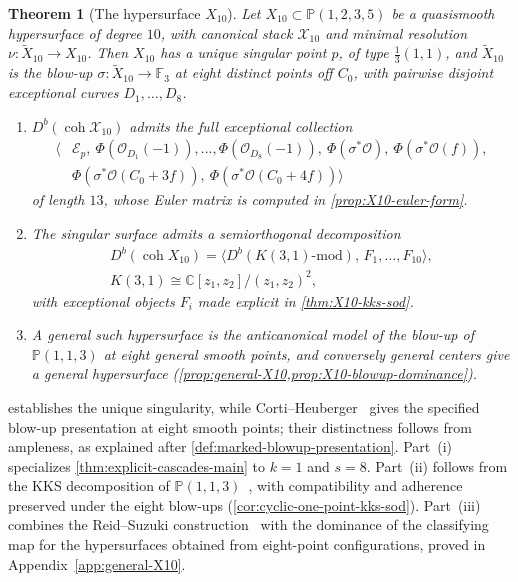 \documentclass[11pt]{article}
\theoremstyle{plain}
\newtheorem{theorem}{Theorem}[section]
\theoremstyle{definition}
\theoremstyle{remark}
\begin{document}
\begin{theorem}[The hypersurface \(X_{10}\)]\label{thm:X10-main}
Let $X_{10}\subset\mathbb P(1,2,3,5)$ be a quasismooth hypersurface of
degree $10$, with canonical stack $\mathcal X_{10}$ and minimal resolution
$\nu\colon\widetilde X_{10}\to X_{10}$. Then $X_{10}$ has a unique singular
point $p$, of type $\tfrac13(1,1)$, and $\widetilde X_{10}$ is the blow-up
$\sigma\colon\widetilde X_{10}\to\mathbb F_3$ at eight distinct points off
$C_0$, with pairwise disjoint exceptional curves $D_1,\dots,D_8$.
\begin{enumerate}[label=(\roman*)]
\item $D^b(\operatorname{coh}\mathcal X_{10})$ admits the full exceptional
collection
\[
\begin{aligned}
\bigl\langle &\mathcal E_p,\ \Phi(\mathcal O_{D_1}(-1)),\dots,\Phi(\mathcal O_{D_8}(-1)),\
\Phi(\sigma^*\mathcal O),\ \Phi(\sigma^*\mathcal O(f)),\\
&\Phi(\sigma^*\mathcal O(C_0+3f)),\ \Phi(\sigma^*\mathcal O(C_0+4f))\bigr\rangle
\end{aligned}
\]
of length $13$, whose Euler matrix is computed in \cref{prop:X10-euler-form}.
\item The singular surface admits a semiorthogonal decomposition
\[
\begin{gathered}
D^b(\operatorname{coh}X_{10})=\bigl\langle D^b(K(3,1)\text{-mod}),\,F_1,\dots,F_{10}\bigr\rangle,\\
K(3,1)\cong\mathbb C[z_1,z_2]/(z_1,z_2)^2,
\end{gathered}
\]
with exceptional objects $F_i$ made explicit in \cref{thm:X10-kks-sod}.
\item A general such hypersurface is the anticanonical model of the
blow-up of $\mathbb P(1,1,3)$ at eight general smooth points, and conversely
general centers give a general hypersurface
(\cref{prop:general-X10,prop:X10-blowup-dominance}).
\end{enumerate}
\end{theorem}

 establishes the unique singularity, while
Corti--Heuberger~\cite[Corollary~8(1)]{Corti2016} gives the specified blow-up
presentation at eight smooth points; their distinctness follows from ampleness,
as explained after \cref{def:marked-blowup-presentation}. Part~(i) specializes
\cref{thm:explicit-cascades-main} to $k=1$ and $s=8$. Part~(ii) follows from the KKS decomposition of $\mathbb P(1,1,3)$~\cite[Example~3.17]{KKS2020}, with compatibility and adherence preserved under the eight blow-ups (\cref{cor:cyclic-one-point-kks-sod}). Part~(iii) combines the Reid--Suzuki construction~\cite{ReidSuzuki2004} with the dominance of the classifying map for the hypersurfaces obtained from eight-point configurations, proved in Appendix~\ref{app:general-X10}.
\end{document}
